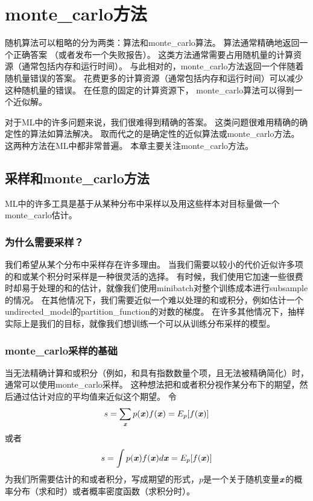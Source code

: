 \chapter{\gls{monte_carlo}方法}
\label{chap:monte_carlo_methods}

随机算法可以粗略的分为两类：算法和\gls{monte_carlo}算法。
算法通常精确地返回一个正确答案 （或者发布一个失败报告）。
这类方法通常需要占用随机量的计算资源（通常包括内存和运行时间）。
与此相对的，\gls{monte_carlo}方法返回一个伴随着随机量错误的答案。
花费更多的计算资源（通常包括内存和运行时间）可以减少这种随机量的错误。
在任意的固定的计算资源下， \gls{monte_carlo}算法可以得到一个近似解。

对于\gls{ML}中的许多问题来说，我们很难得到精确的答案。
这类问题很难用精确的确定性的算法如算法解决。
取而代之的是确定性的近似算法或\gls{monte_carlo}方法。
这两种方法在\gls{ML}中都非常普遍。
本章主要关注\gls{monte_carlo}方法。

\section{采样和\gls{monte_carlo}方法}
\label{sec:sampling_and_monte_carlo_methods}

\gls{ML}中的许多工具是基于从某种分布中采样以及用这些样本对目标量做一个\gls{monte_carlo}估计。

\subsection{为什么需要采样？}
\label{sec:why_sampling}

我们希望从某个分布中采样存在许多理由。
当我们需要以较小的代价近似许多项的和或某个积分时采样是一种很灵活的选择。
有时候，我们使用它加速一些很费时却易于处理的和的估计，就像我们使用\gls{minibatch}对整个训练成本进行subsample的情况。
在其他情况下，我们需要近似一个难以处理的和或积分，例如估计一个\gls{undirected_model}的\gls{partition_function}的对数的梯度。
在许多其他情况下，抽样实际上是我们的目标，就像我们想训练一个可以从训练分布采样的模型。

\subsection{\gls{monte_carlo}采样的基础}
\label{sec:basics_of_monte_carlo_sampling}

当无法精确计算和或积分（例如，和具有指数数量个项，且无法被精确简化）时，通常可以使用\gls{monte_carlo}采样。
这种想法把和或者积分视作某分布下的期望，然后通过估计对应的平均值来近似这个期望。
令
\begin{align}
s = \sum_{\boldsymbol{\mathit{x}}} p(\boldsymbol{\mathit{x}})f(\boldsymbol{\mathit{x}}) = E_p[f(\boldsymbol{\mathit{x}})]
\end{align}
或者
\begin{align}
\label{eqn:integra}
s = \int p(\boldsymbol{\mathit{x}})f(\boldsymbol{\mathit{x}})d\boldsymbol{\mathit{x}} = E_p[f(\boldsymbol{\mathit{x}})]
\end{align}
为我们所需要估计的和或者积分，写成期望的形式，$p$是一个关于随机变量$\boldsymbol{\mathit{x}}$的概率分布（求和时）或者概率密度函数（求积分时）。

